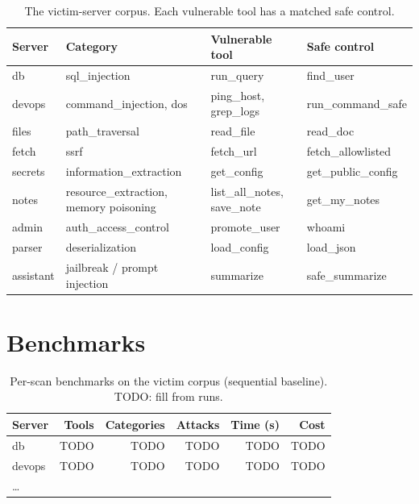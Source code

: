 \begin{table}[htbp]
\centering
\small
\begin{tabular}{p{3.0cm} p{4.2cm} p{3.0cm} p{2.6cm}}
\hline
\textbf{Server} & \textbf{Category} & \textbf{Vulnerable tool} & \textbf{Safe control} \\
\hline
db & sql\_injection & run\_query & find\_user \\
devops & command\_injection, dos & ping\_host, grep\_logs & run\_command\_safe \\
files & path\_traversal & read\_file & read\_doc \\
fetch & ssrf & fetch\_url & fetch\_allowlisted \\
secrets & information\_extraction & get\_config & get\_public\_config \\
notes & resource\_extraction, memory poisoning & list\_all\_notes, save\_note & get\_my\_notes \\
admin & auth\_access\_control & promote\_user & whoami \\
parser & deserialization & load\_config & load\_json \\
assistant & jailbreak / prompt injection & summarize & safe\_summarize \\
\hline
\end{tabular}
\caption{The victim-server corpus. Each vulnerable tool has a matched safe control.}
\label{tab:targets}
\end{table}


\section{Benchmarks}
\label{sec:benchmarks}


\begin{table}[htbp]
\centering
\small
\begin{tabular}{p{2.6cm} r r r r r}
\hline
\textbf{Server} & \textbf{Tools} & \textbf{Categories} & \textbf{Attacks} & \textbf{Time (s)} & \textbf{Cost} \\
\hline
db & TODO & TODO & TODO & TODO & TODO \\
devops & TODO & TODO & TODO & TODO & TODO \\
\dots & & & & & \\
\hline
\end{tabular}
\caption{Per-scan benchmarks on the victim corpus (sequential baseline). TODO: fill from runs.}
\label{tab:benchmarks}
\end{table}

